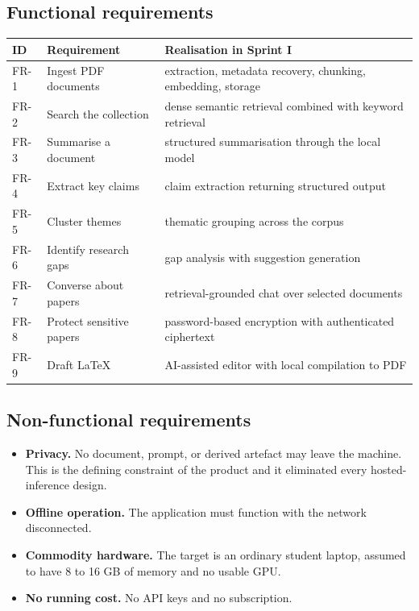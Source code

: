 \documentclass[11pt,a4paper]{article}
\begin{document}
\subsection{Functional requirements}

\begin{center}
\small
\begin{tabularx}{\linewidth}{@{}llX@{}}
\toprule
\textbf{ID} & \textbf{Requirement} & \textbf{Realisation in Sprint I} \\
\midrule
FR-1 & Ingest PDF documents & extraction, metadata recovery, chunking, embedding, storage \\
FR-2 & Search the collection & dense semantic retrieval combined with keyword retrieval \\
FR-3 & Summarise a document & structured summarisation through the local model \\
FR-4 & Extract key claims & claim extraction returning structured output \\
FR-5 & Cluster themes & thematic grouping across the corpus \\
FR-6 & Identify research gaps & gap analysis with suggestion generation \\
FR-7 & Converse about papers & retrieval-grounded chat over selected documents \\
FR-8 & Protect sensitive papers & password-based encryption with authenticated ciphertext \\
FR-9 & Draft LaTeX & AI-assisted editor with local compilation to PDF \\
\bottomrule
\end{tabularx}
\end{center}

\subsection{Non-functional requirements}

\begin{itemize}[leftmargin=*]
  \item \textbf{Privacy.} No document, prompt, or derived artefact may leave the
        machine. This is the defining constraint of the product and it
        eliminated every hosted-inference design.
  \item \textbf{Offline operation.} The application must function with the
        network disconnected.
  \item \textbf{Commodity hardware.} The target is an ordinary student laptop,
        assumed to have 8 to 16 GB of memory and no usable GPU.
  \item \textbf{No running cost.} No API keys and no subscription.
\end{itemize}
\end{document}
